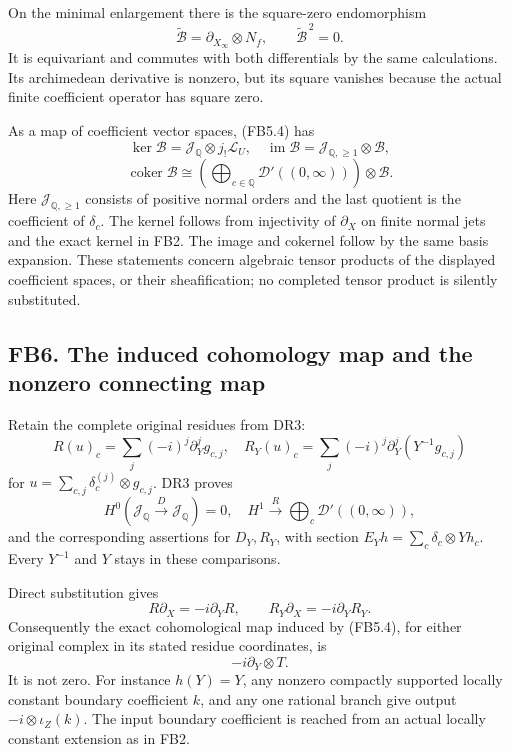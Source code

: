On the minimal enlargement there is the square-zero endomorphism \[
\widetilde{\mathcal B}
=\partial_{X_\infty}\otimes N_f,\qquad
\widetilde{\mathcal B}^{\,2}=0.
\tag{FB5.7}
\] It is equivariant and commutes with both differentials by the same
calculations. Its archimedean derivative is nonzero, but its square
vanishes because the actual finite coefficient operator has square zero.

As a map of coefficient vector spaces, (FB5.4) has \[
\ker\mathcal B
=\mathcal J_{\mathbb Q}\otimes j_!\mathscr L_U,
\quad
\operatorname{im}\mathcal B
=\mathcal J_{\mathbb Q,\ge1}\otimes\mathscr B,
\] \[
\operatorname{coker}\mathcal B
\cong\left(\bigoplus_{c\in\mathbb Q}\mathcal D'((0,\infty))\right)
\otimes\mathscr B.
\tag{FB5.8}
\] Here \(\mathcal J_{\mathbb Q,\ge1}\) consists of positive normal
orders and the last quotient is the coefficient of \(\delta_c\). The
kernel follows from injectivity of \(\partial_X\) on finite normal jets
and the exact kernel in FB2. The image and cokernel follow by the same
basis expansion. These statements concern algebraic tensor products of
the displayed coefficient spaces, or their sheafification; no completed
tensor product is silently substituted.

\subsection{FB6. The induced cohomology map and the nonzero connecting
map}\label{fb6.-the-induced-cohomology-map-and-the-nonzero-connecting-map}

Retain the complete original residues from DR3: \[
R(u)_c=\sum_j(-i)^j\partial_Y^jg_{c,j},
\quad
R_Y(u)_c=\sum_j(-i)^j\partial_Y^j(Y^{-1}g_{c,j})
\tag{FB6.1}
\] for \(u=\sum_{c,j}\delta_c^{(j)}\otimes g_{c,j}\). DR3 proves \[
H^0(\mathcal J_{\mathbb Q}\xrightarrow D\mathcal J_{\mathbb Q})=0,\quad
H^1\xrightarrow{\ R\ }\bigoplus_c\mathcal D'((0,\infty)),
\] and the corresponding assertions for \(D_Y,R_Y\), with section
\(E_Yh=\sum_c\delta_c\otimes Yh_c\). Every \(Y^{-1}\) and \(Y\) stays in
these comparisons.

Direct substitution gives \[
R\partial_X=-i\partial_YR,\qquad
R_Y\partial_X=-i\partial_YR_Y.
\tag{FB6.2}
\] Consequently the exact cohomological map induced by (FB5.4), for
either original complex in its stated residue coordinates, is \[
\boxed{-i\partial_Y\otimes T.}
\tag{FB6.3}
\] It is not zero. For instance \(h(Y)=Y\), any nonzero compactly
supported locally constant boundary coefficient \(k\), and any one
rational branch give output \(-i\otimes\iota_Z(k)\). The input boundary
coefficient is reached from an actual locally constant extension as in
FB2.

